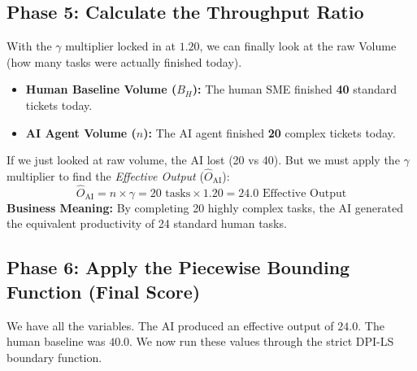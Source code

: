 \documentclass[11pt,a4paper]{article}
\begin{document}
\vspace{0.5cm}

\subsection{Phase 5: Calculate the Throughput Ratio}

With the $\gamma$ multiplier locked in at $1.20$, we can finally look at the raw Volume (how many tasks were actually finished today).

\begin{itemize}
    \item \textbf{Human Baseline Volume ($B_H$):} The human SME finished \textbf{40} standard tickets today.
    \item \textbf{AI Agent Volume ($n$):} The AI agent finished \textbf{20} complex tickets today.
\end{itemize}

\begin{tcolorbox}[enhanced, colback=dpiblue!5!white, colframe=dpiblue, title={\textbf{Phase 5: Effective Output Calculation}}, fonttitle=\bfseries]
If we just looked at raw volume, the AI lost (20 vs 40). But we must apply the $\gamma$ multiplier to find the \textit{Effective Output} ($\hat{O}_{\text{AI}}$):
\[
\hat{O}_{\text{AI}} = n \times \gamma = 20 \text{ tasks} \times 1.20 = \mathbf{24.0} \text{ Effective Output}
\]
\textbf{Business Meaning:} By completing 20 highly complex tasks, the AI generated the equivalent productivity of 24 standard human tasks.
\end{tcolorbox}

\newpage

\subsection{Phase 6: Apply the Piecewise Bounding Function (Final Score)}

We have all the variables. The AI produced an effective output of $24.0$. The human baseline was $40.0$. We now run these values through the strict DPI-LS boundary function.
\end{document}
